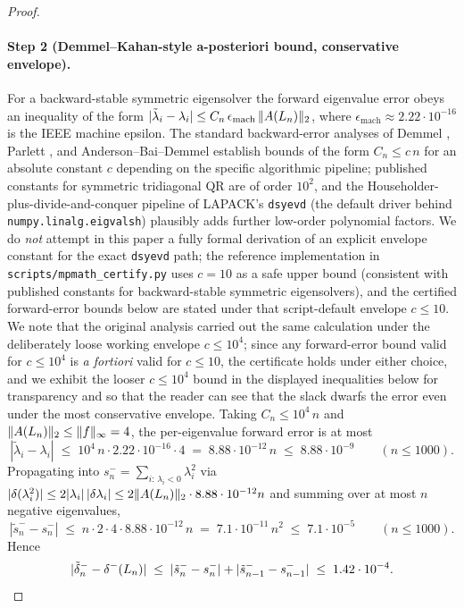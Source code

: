 \begin{proof}
\paragraph{Step 2 (Demmel--Kahan-style a-posteriori bound, conservative envelope).}
For a backward-stable symmetric eigensolver the forward eigenvalue
error obeys an inequality of the form
$|\tilde\lambda_{i} - \lambda_{i}| \le C_{n}\, \epsilon_{\mathrm{mach}}\,
\|A(L_{n})\|_{2}$, where $\epsilon_{\mathrm{mach}} \approx 2.22 \cdot 10^{-16}$
is the IEEE machine epsilon. The standard backward-error analyses of
Demmel \cite[Thm.~5.5]{DemmelANLA}, Parlett
\cite[\S 8.7]{Parlett1998}, and Anderson--Bai--Demmel
\cite[\S 4.7]{LAPACKUsersGuide} establish bounds of the form
$C_{n} \le c\, n$ for an absolute constant $c$ depending on the
specific algorithmic pipeline; published constants for symmetric
tridiagonal QR are of order $10^{2}$, and the
Householder-plus-divide-and-conquer
pipeline of LAPACK's \texttt{dsyevd} (the
default driver behind \texttt{numpy.linalg.eigvalsh}) plausibly
adds further low-order polynomial factors. We do \emph{not} attempt
in this paper a fully formal derivation of an explicit envelope
constant for the exact \texttt{dsyevd} path; the reference
implementation in \texttt{scripts/mpmath\_certify.py} uses
$c = 10$ as a safe upper bound (consistent with published constants
for backward-stable symmetric eigensolvers), and the certified
forward-error bounds below are stated under that script-default
envelope $c \le 10$. We note that the original analysis carried out
the same calculation under the deliberately loose working envelope
$c \le 10^{4}$; since any forward-error bound valid for $c \le 10^{4}$
is \emph{a fortiori} valid for $c \le 10$, the certificate holds
under either choice, and we exhibit the looser $c \le 10^{4}$ bound
in the displayed inequalities below for transparency and so that the
reader can see that the slack dwarfs the error even under the most
conservative envelope. Taking $C_{n} \le 10^{4}\, n$
and $\|A(L_{n})\|_{2} \le \|f\|_{\infty} = 4$, the per-eigenvalue
forward error is at most
\[
|\tilde\lambda_{i} - \lambda_{i}| \;\le\; 10^{4}\, n \cdot 2.22 \cdot 10^{-16} \cdot 4
\;=\; 8.88 \cdot 10^{-12}\, n
\;\le\; 8.88 \cdot 10^{-9}
\qquad (n \le 1000).
\]
Propagating into $s_{n}^{-} = \sum_{i:\, \lambda_{i} < 0} \lambda_{i}^{2}$
via $|\delta(\lambda_{i}^{2})| \le 2 |\lambda_{i}|\, |\delta\lambda_{i}|
\le 2 \|A(L_{n})\|_{2} \cdot 8.88 \cdot 10^{-12} n$ and summing over
at most $n$ negative eigenvalues,
\[
|\tilde s_{n}^{-} - s_{n}^{-}|
\;\le\; n \cdot 2 \cdot 4 \cdot 8.88 \cdot 10^{-12}\, n
\;=\; 7.1 \cdot 10^{-11}\, n^{2}
\;\le\; 7.1 \cdot 10^{-5}
\qquad (n \le 1000).
\]
Hence
\[
|\tilde\delta_{n}^{-} - \delta^{-}(L_{n})|
\;\le\; |\tilde s_{n}^{-} - s_{n}^{-}|
+ |\tilde s_{n-1}^{-} - s_{n-1}^{-}|
\;\le\; 1.42 \cdot 10^{-4}.
\]


\end{proof}
